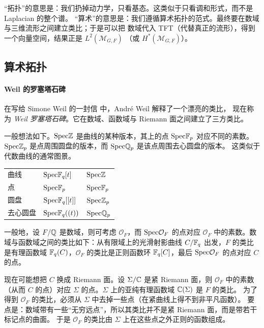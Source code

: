 “拓扑”的意思是：我们扔掉动力学，只看基态。这类似于只看调和形式，而不是 Laplacian 的整个谱。
“算术”的意思是：我们遵循算术拓扑的范式。最终要在数域与三维流形之间建立类比；于是可以把
数域代入 TFT（代替真正的流形），得到一个向量空间，结果正是 $L^2(\mathcal{M}_{G,F})$
（或 $H^*(\mathcal{M}_{G,F})$）。

\subsection{算术拓扑}

\paragraph{Weil 的罗塞塔石碑}
在写给 Simone Weil 的一封信 \cite{Kri05} 中，André Weil 解释了一个漂亮的类比，
现在称为 \emph{Weil 罗塞塔石碑}。它在数域、函数域与 Riemann 面之间建立了三方类比。

一般想法如下。$\mathrm{Spec}\mathbb{Z}$ 是曲线的某种版本，其上的点 $\mathrm{Spec}\mathbb{F}_p$ 对应不同的素数。
$\mathrm{Spec}\mathbb{Z}_p$ 是点周围圆盘的版本，而 $\mathrm{Spec}\mathbb{Q}_p$ 是该点周围去心圆盘的版本。
这类似于代数曲线的通常图景。
\begin{center}
\begin{tabular}{lll}
  \toprule
  曲线 & $\mathrm{Spec}\mathbb{F}_q[t]$ & $\mathrm{Spec}\mathbb{Z}$\\
  点 & $\mathrm{Spec}\mathbb{F}_p$ & $\mathrm{Spec}\mathbb{F}_p$\\
  圆盘 & $\mathrm{Spec}\mathbb{F}_q[[t]]$ & $\mathrm{Spec}\mathbb{Z}_p$\\
  去心圆盘 & $\mathrm{Spec}\mathbb{F}_q((t))$ & $\mathrm{Spec}\mathbb{Q}_p$\\
  \bottomrule
\end{tabular}
\end{center}


一般地，设 $F/\mathbb{Q}$ 是数域，则可考虑 $\mathcal{O}_F$，而 $\mathrm{Spec}\mathcal{O}_F$ 的点对应
$\mathcal{O}_F$ 中的素数。数域与函数域之间的类比如下：从有限域上的光滑射影曲线
$C/\mathbb{F}_q$ 出发，$F$ 的类比是有理函数域 $\mathbb{F}_q(C)$，$\mathcal{O}_F$ 的类比是正则函数环
$\mathbb{F}_q[C]$，最后 $\mathrm{Spec}\mathcal{O}_F$ 的点对应 $C$ 的点。

现在可能想把 $C$ 换成 Riemann 面。设 $\Sigma/\mathbb{C}$ 是紧 Riemann 面，则 $\mathcal{O}_F$ 中的素数
（从而 $C$ 的点）对应 $\Sigma$ 的点。$\Sigma$ 上的亚纯有理函数域 $\mathbb{C}(\Sigma)$ 是 $F$ 的类比。
为了得到 $\mathcal{O}_F$ 的类比，必须从 $\Sigma$ 中去掉一些点（在紧曲线上得不到非平凡函数）。
要点是：数域带有一些“无穷远点”，所以其类比并不是紧 Riemann 面，而是带若干标记点的曲面。
于是 $\mathcal{O}_F$ 的类比由 $\Sigma$ 上在这些点之外正则的函数组成。

